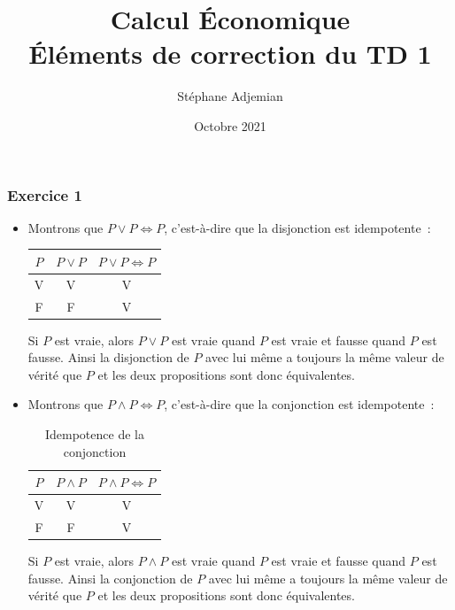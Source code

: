 \documentclass[10pt,notheorems]{beamer}
\theoremstyle{plain}
\theoremstyle{definition} %
\begin{document}
\title{Calcul Économique\\\small{Éléments de correction du TD 1}}
\author[S. Adjemian]{Stéphane Adjemian}
 \date{Octobre 2021}

\begin{frame}
  \titlepage{}
\end{frame}


\begin{frame}
  \frametitle{Exercice 1}
  \fontsize{8}{10}\selectfont

  \begin{itemize}

  \item Montrons que $P\lor P \Leftrightarrow P$, c'est-à-dire que la disjonction est idempotente~:\newline
    \begin{table}[H]
      \centering
      \begin{tabular}[H]{|cc|c|}
        \hline
        $P$ & $P\lor P$ & $P\lor P \Leftrightarrow P$\\ \hline
        V & V & V \\
        F & F & V \\
        \hline\hline
      \end{tabular}
      \label{tab:or:idempotence}
    \end{table}

    \bigskip

  Si $P$ est vraie, alors $P\lor P$ est vraie quand $P$ est vraie et fausse
  quand $P$ est fausse. Ainsi la disjonction de $P$ avec lui même a toujours la
  même valeur de vérité que $P$ et les deux propositions sont donc équivalentes.\newline

  \item Montrons que $P\land P \Leftrightarrow P$, c'est-à-dire que la conjonction est idempotente~:\newline
    \begin{table}[H]
      \centering
      \begin{tabular}[H]{|cc|c|}
        \hline
        $P$ & $P\land P$ & $P\land P \Leftrightarrow P$\\ \hline
        V & V & V \\
        F & F & V \\
        \hline\hline
      \end{tabular}
      \caption{Idempotence de la conjonction}
      \label{tab:and:idempotence}
    \end{table}

    \bigskip

  Si $P$ est vraie, alors $P\land P$ est vraie quand $P$ est vraie et fausse
  quand $P$ est fausse. Ainsi la conjonction de $P$ avec lui même a toujours la
  même valeur de vérité que $P$ et les deux propositions sont donc équivalentes.

  \end{itemize}

\end{frame}
\end{document}
